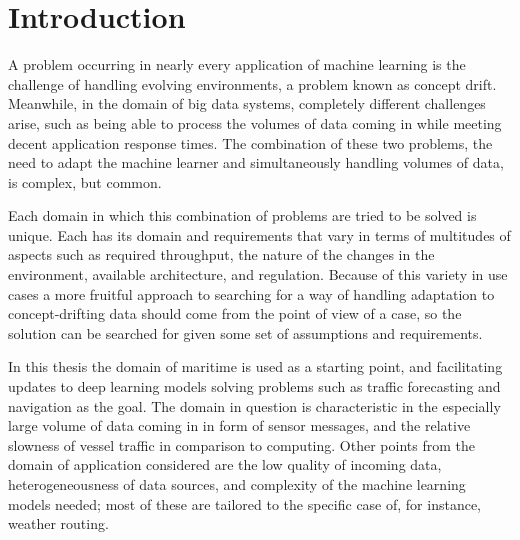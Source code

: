 \chapter{Introduction}
A problem occurring in nearly every application of machine learning is the challenge of handling evolving environments, a problem known as  concept drift. Meanwhile, in the domain of big data systems, completely different challenges arise, such as being able to process the volumes of data coming in while meeting decent application response times. The combination of these two problems, the need to adapt the machine learner and simultaneously handling volumes of data, is complex, but common.


Each domain in which this combination of problems are tried to be solved is unique. Each has its domain and requirements that vary in terms of multitudes of aspects such as required throughput, the nature of the changes in the environment, available architecture, and regulation.
Because of this variety in use cases a more fruitful approach to searching for a way of handling adaptation to concept-drifting data should come from the point of view of a case, so the solution can be searched for given some set of assumptions and requirements. 

In this thesis the domain of maritime is used as a starting point, and facilitating updates to deep learning models solving problems such as traffic forecasting and navigation as the goal. The domain in question is characteristic in the especially large volume of data coming in in form of sensor messages, and the relative slowness of vessel traffic in comparison to computing. Other points from the domain of application considered are the low quality of incoming data, heterogeneousness of data sources, and complexity of the machine learning models needed; most of these are tailored to the specific case of, for instance, weather routing.

